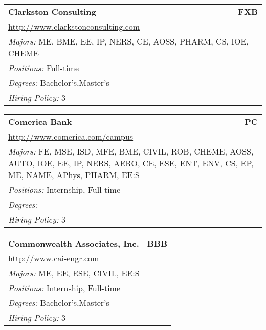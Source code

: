 \documentclass[twoside]{article}
\begin{document}
\begin{center}
\begin{multicols}{3}
\begin{FlushLeft}
\begin{minipage}{\columnwidth}\begin{tabularx}{.95\columnwidth}{Xr}
                 {\Large\bf Clarkston Consulting} & {\Large\bf FXB}\\
    \multicolumn{2}{p{.95\columnwidth}}{\url{http://www.clarkstonconsulting.com}}\\
    \multicolumn{2}{p{.95\columnwidth}}{\emph{Majors:} ME, BME, EE, IP, NERS, CE, AOSS, PHARM, CS, IOE, CHEME}\\
    \multicolumn{2}{p{.95\columnwidth}}{\emph{Positions:} Full-time}\\
    \multicolumn{2}{p{.95\columnwidth}}{\emph{Degrees:} Bachelor's,Master's}\\
    \multicolumn{2}{p{.95\columnwidth}}{\emph{Hiring Policy:} 3}\\
    \end{tabularx}
    
\end{minipage}
 
\begin{minipage}{\columnwidth}\begin{tabularx}{.95\columnwidth}{Xr}
                 {\Large\bf Comerica Bank} & {\Large\bf PC}\\
    \multicolumn{2}{p{.95\columnwidth}}{\url{http://www.comerica.com/campus}}\\
    \multicolumn{2}{p{.95\columnwidth}}{\emph{Majors:} FE, MSE, ISD, MFE, BME, CIVIL, ROB, CHEME, AOSS, AUTO, IOE, EE, IP, NERS, AERO, CE, ESE, ENT, ENV, CS, EP, ME, NAME, APhys, PHARM, EE:S}\\
    \multicolumn{2}{p{.95\columnwidth}}{\emph{Positions:} Internship, Full-time}\\
    \multicolumn{2}{p{.95\columnwidth}}{\emph{Degrees:} }\\
    \multicolumn{2}{p{.95\columnwidth}}{\emph{Hiring Policy:} 3}\\
    \end{tabularx}
    
\end{minipage}
 
\begin{minipage}{\columnwidth}\begin{tabularx}{.95\columnwidth}{Xr}
                 {\Large\bf Commonwealth Associates, Inc.} & {\Large\bf BBB}\\
    \multicolumn{2}{p{.95\columnwidth}}{\url{http://www.cai-engr.com}}\\
    \multicolumn{2}{p{.95\columnwidth}}{\emph{Majors:} ME, EE, ESE, CIVIL, EE:S}\\
    \multicolumn{2}{p{.95\columnwidth}}{\emph{Positions:} Internship, Full-time}\\
    \multicolumn{2}{p{.95\columnwidth}}{\emph{Degrees:} Bachelor's,Master's}\\
    \multicolumn{2}{p{.95\columnwidth}}{\emph{Hiring Policy:} 3}\\
    \end{tabularx}
    

\end{minipage}
\end{FlushLeft}
\end{multicols}
\end{center}
\end{document}
